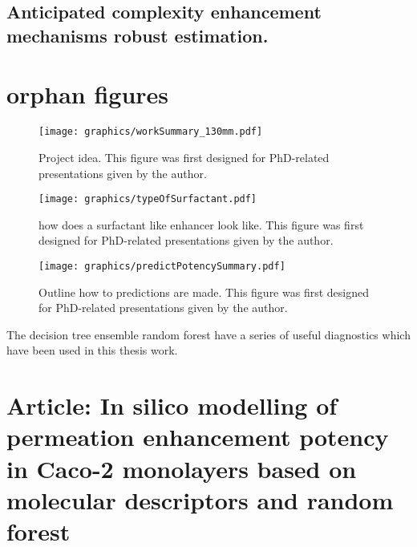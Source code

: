 \subsection{Anticipated complexity enhancement mechanisms robust estimation.}
\label{modelComplexity}

\section{orphan figures}




\begin{figure}[!htbp]
\texttt{[image: graphics/workSummary\_130mm.pdf]}
\caption{Project idea. This figure was first designed for PhD-related presentations given by the author.}
\label{workSummary}
\end{figure}

\begin{figure}[!htpb]
\texttt{[image: graphics/typeOfSurfactant.pdf]}
\caption{how does a surfactant like enhancer look like. This figure was first designed for PhD-related presentations given by the author.}
\label{typeOfSurfactant}
\end{figure}

\begin{figure}[!htpb]
\texttt{[image: graphics/predictPotencySummary.pdf]}
\caption{Outline how to predictions are made. This figure was first designed for PhD-related presentations given by the author.}
\label{predictPotencySummary}
\end{figure}

The decision tree ensemble random forest have a series of useful diagnostics which have been used in this thesis work.

\section{Article: In silico modelling of permeation enhancement potency in Caco-2
monolayers based on molecular descriptors and random forest}
\label{article:predAbs}

\newpage




